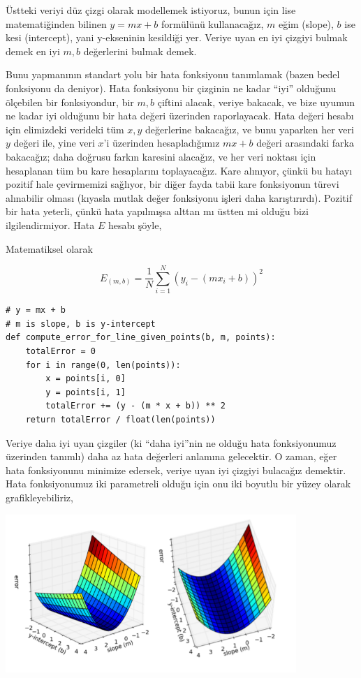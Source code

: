 \documentclass[12pt,fleqn]{article}\usepackage{../../common}
\begin{document}
Üstteki veriyi düz çizgi olarak modellemek istiyoruz, bunun için lise
matematiğinden bilinen $y = mx + b$ formülünü kullanacağız, $m$ eğim (slope),
$b$ ise kesi (intercept), yani y-ekseninin kesildiği yer. Veriye uyan en iyi
çizgiyi bulmak demek en iyi $m,b$ değerlerini bulmak demek.

Bunu yapmanının standart yolu bir hata fonksiyonu tanımlamak (bazen bedel
fonksiyonu da deniyor). Hata fonksiyonu bir çizginin ne kadar ``iyi'' olduğunu
ölçebilen bir fonksiyondur, bir $m,b$ çiftini alacak, veriye bakacak, ve bize
uyumun ne kadar iyi olduğunu bir hata değeri üzerinden raporlayacak. Hata değeri
hesabı için elimizdeki verideki tüm $x,y$ değerlerine bakacağız, ve bunu
yaparken her veri $y$ değeri ile, yine veri $x$'i üzerinden hesapladığımız
$mx+b$ değeri arasındaki farka bakacağız; daha doğrusu farkın karesini alacağız,
ve her veri noktası için hesaplanan tüm bu kare hesaplarını toplayacağız. Kare
alınıyor, çünkü bu hatayı pozitif hale çevirmemizi sağlıyor, bir diğer fayda
tabii kare fonksiyonun türevi alınabilir olması (kıyasla mutlak değer fonksiyonu
işleri daha karıştırırdı). Pozitif bir hata yeterli, çünkü hata yapılmışsa
alttan mı üstten mi olduğu bizi ilgilendirmiyor. Hata $E$ hesabı şöyle,

Matematiksel olarak

$$ E_{(m,b)} = \frac{1}{N} \sum _{i=1}^{N} (y_i - (mx_i + b))^2$$

\begin{verbatim}
# y = mx + b
# m is slope, b is y-intercept
def compute_error_for_line_given_points(b, m, points):
    totalError = 0
    for i in range(0, len(points)):
        x = points[i, 0]
        y = points[i, 1]
        totalError += (y - (m * x + b)) ** 2
    return totalError / float(len(points))
\end{verbatim}

Veriye daha iyi uyan çizgiler (ki ``daha iyi''nin ne olduğu hata fonksiyonumuz
üzerinden tanımlı) daha az hata değerleri anlamına gelecektir. O zaman, eğer
hata fonksiyonunu minimize edersek, veriye uyan iyi çizgiyi bulacağız
demektir. Hata fonksiyonumuz iki parametreli olduğu için onu iki boyutlu bir
yüzey olarak grafikleyebiliriz,

\includegraphics[height=6cm]{vision_90fitting_06.png}
\end{document}
